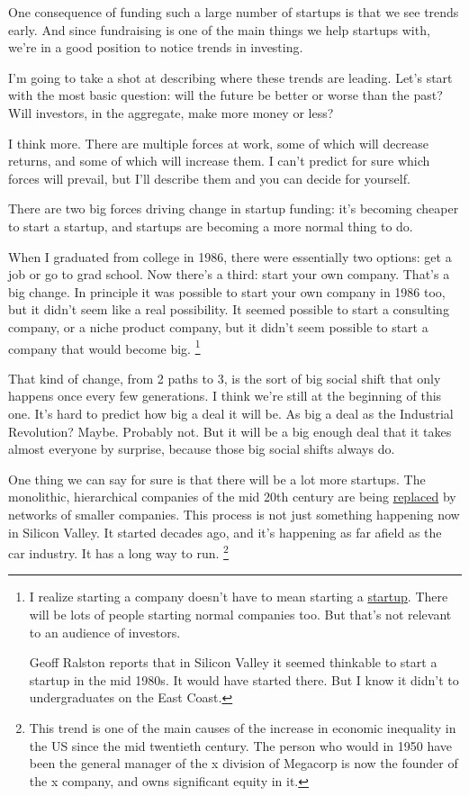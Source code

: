 One consequence of funding such a large number of startups is that we
see trends early. And since fundraising is one of the main things we
help startups with, we're in a good position to notice trends in
investing.

I'm going to take a shot at describing where these trends are leading.
Let's start with the most basic question: will the future be better or
worse than the past? Will investors, in the aggregate, make more money
or less?

I think more. There are multiple forces at work, some of which will
decrease returns, and some of which will increase them. I can't predict
for sure which forces will prevail, but I'll describe them and you can
decide for yourself.

There are two big forces driving change in startup funding: it's
becoming cheaper to start a startup, and startups are becoming a more
normal thing to do.

When I graduated from college in 1986, there were essentially two
options: get a job or go to grad school. Now there's a third: start your
own company. That's a big change. In principle it was possible to start
your own company in 1986 too, but it didn't seem like a real
possibility. It seemed possible to start a consulting company, or a
niche product company, but it didn't seem possible to start a company
that would become big. \footnote{I realize starting a company doesn't have to mean starting a
\href{growth.html}{startup}. There will be lots of people starting
normal companies too. But that's not relevant to an audience of
investors.

Geoff Ralston reports that in Silicon Valley it seemed thinkable to
start a startup in the mid 1980s. It would have started there. But I
know it didn't to undergraduates on the East Coast.}

That kind of change, from 2 paths to 3, is the sort of big social shift
that only happens once every few generations. I think we're still at the
beginning of this one. It's hard to predict how big a deal it will be.
As big a deal as the Industrial Revolution? Maybe. Probably not. But it
will be a big enough deal that it takes almost everyone by surprise,
because those big social shifts always do.

One thing we can say for sure is that there will be a lot more startups.
The monolithic, hierarchical companies of the mid 20th century are being
\href{highres.html}{replaced} by networks of smaller companies. This
process is not just something happening now in Silicon Valley. It
started decades ago, and it's happening as far afield as the car
industry. It has a long way to run. \footnote{This trend is one of the main causes of the increase in economic
inequality in the US since the mid twentieth century. The person who
would in 1950 have been the general manager of the x division of
Megacorp is now the founder of the x company, and owns significant
equity in it.}

